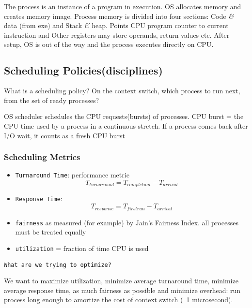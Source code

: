 \documentclass{article}
\begin{document}
The process is an instance of a program in execution. OS allocates memory and
creates memory image. Process memory is divided into four sections: Code \textit{\&} data (from exe) and Stack \textit{\&} heap. Points CPU program counter to current instruction and Other registers may store operands, return values etc. After setup, OS is out of the way and the process executes directly on CPU.

\subsection{Scheduling Policies(disciplines)}
What is a scheduling policy? On the context switch, which process to run next, from the set of ready processes?

OS scheduler schedules the CPU requests(bursts) of processes. CPU burst = the CPU time used by a process in a continuous stretch. If a process comes back after I/O wait, it counts as a fresh CPU burst

\subsubsection{Scheduling Metrics}
\begin{itemize}
    \item \texttt{Turnaround Time}: performance metric
        $$T_{turnaround} = T_{completion} - T_{arrival}$$

    \item \texttt{Response Time}:
        $$T_{response} = T_{firstrun} - T_{arrival}$$

    \item \texttt{fairness} as measured (for example) by Jain’s Fairness Index. all processes must be treated equally

    \item \texttt{utilization} = fraction of time CPU is used
\end{itemize}
\texttt{What are we trying to optimize?}

We want to maximize utilization, minimize average turnaround time, minimize average response time, as much fairness as possible and minimize overhead: run process long enough to amortize the cost of context switch (\texttt{~}1 microsecond).
\end{document}
